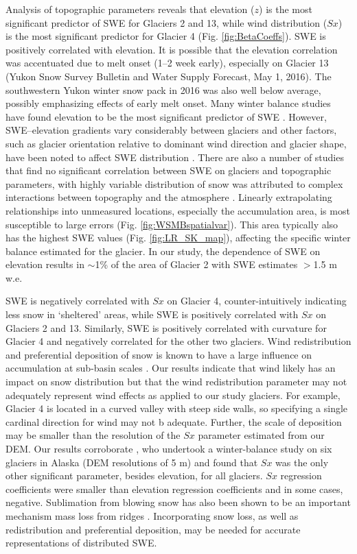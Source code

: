 \documentclass[twocolumn, letterpaper]{igs}
\begin{document}
Analysis of topographic parameters reveals that elevation ($z$) is the most significant predictor of SWE for Glaciers 2 and 13, while wind distribution ($Sx$) is the most significant predictor for Glacier 4 (Fig. \ref{fig:BetaCoeffs}). SWE is positively correlated with elevation. It is possible that the elevation correlation was accentuated due to melt onset (1--2 week early), especially on Glacier 13 (Yukon Snow Survey Bulletin and Water Supply Forecast, May 1, 2016). The southwestern Yukon winter snow pack in 2016 was also well below average, possibly emphasizing effects of early melt onset. Many winter balance studies have found elevation to be the most significant predictor of SWE \citep[e.g.][]{Machguth2006, McGrath2015}. However, SWE--elevation gradients vary considerably between glaciers \citep[e.g.][]{Winther1998} and other factors, such as glacier orientation relative to dominant wind direction and glacier shape, have been noted to affect SWE distribution \citep{Machguth2006,Grabiec2011}. There are also a number of studies that find no significant correlation between SWE on glaciers and topographic parameters, with highly variable distribution of snow was attributed to complex interactions between topography and the atmosphere \citep[e.g.][]{Grabiec2011,Lopez2011}. Linearly extrapolating relationships into unmeasured locations, especially the accumulation area, is most susceptible to large errors (Fig. \ref{fig:WSMBspatialvar}). This area typically also has the highest SWE values (Fig. \ref{fig:LR_SK_map}), affecting the specific winter balance estimated for the glacier. In our study, the dependence of SWE on elevation results in $\sim$1\% of the area of Glacier 2 with SWE estimates $>$1.5 m w.e. 

SWE is negatively correlated with $Sx$ on Glacier 4, counter-intuitively indicating less snow in `sheltered' areas, while SWE is positively correlated with $Sx$ on Glaciers 2 and 13. Similarly, SWE is positively correlated with curvature for Glacier 4 and negatively correlated for the other two glaciers. Wind redistribution and preferential deposition of snow is known to have a large influence on accumulation at sub-basin scales \citep[e.g.][]{Dadic2010, Winstral2013,Gerber2017}. Our results indicate that wind likely has an impact on snow distribution but that the wind redistribution parameter may not adequately represent wind effects as applied to our study glaciers. For example, Glacier 4 is located in a curved valley with steep side walls, so specifying a single cardinal direction for wind may not b adequate. Further, the scale of deposition may be smaller than the resolution of the $Sx$ parameter estimated from our DEM. Our results corroborate \cite{McGrath2015}, who undertook a winter-balance study on six glaciers in Alaska (DEM resolutions of 5 m) and found that $Sx$ was the only other significant parameter, besides elevation, for all glaciers. $Sx$ regression coefficients were smaller than elevation regression coefficients and in some cases, negative. Sublimation from blowing snow has also been shown to be an important mechanism mass loss from ridges  \citep[e.g.][]{Musselman2015}. Incorporating snow loss, as well as redistribution and preferential deposition, may be needed for accurate representations of distributed SWE. 
\end{document}
